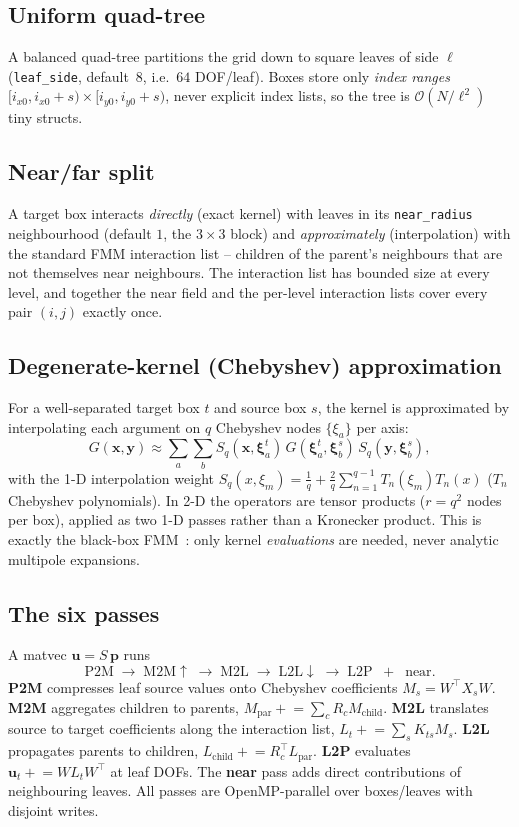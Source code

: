 \documentclass[11pt,a4paper]{article}
\newcommand{\Order}{\mathcal{O}}
\begin{document}
\subsection{Uniform quad-tree}
A balanced quad-tree partitions the grid down to square leaves of side
$\ell$ (\texttt{leaf\_side}, default~$8$, i.e.\ $64$ DOF/leaf). Boxes store
only \emph{index ranges} $[i_{x0},i_{x0}+s)\times[i_{y0},i_{y0}+s)$, never
explicit index lists, so the tree is $\Order(N/\ell^2)$ tiny structs.

\subsection{Near/far split}
A target box interacts \emph{directly} (exact kernel) with leaves in its
\texttt{near\_radius} neighbourhood (default $1$, the $3\times3$ block) and
\emph{approximately} (interpolation) with the standard FMM interaction list
-- children of the parent's neighbours that are not themselves near
neighbours. The interaction list has bounded size at every level, and
together the near field and the per-level interaction lists cover every pair
$(i,j)$ exactly once.

\subsection{Degenerate-kernel (Chebyshev) approximation}
For a well-separated target box $t$ and source box $s$, the kernel is
approximated by interpolating each argument on $q$ Chebyshev nodes
$\{\xi_a\}$ per axis:
\begin{equation}
  G(\mathbf{x},\mathbf{y}) \approx
  \sum_{a}\sum_{b} S_q(\mathbf{x},\boldsymbol{\xi}_a^{t})\,
  G(\boldsymbol{\xi}_a^{t},\boldsymbol{\xi}_b^{s})\,
  S_q(\mathbf{y},\boldsymbol{\xi}_b^{s}),
\end{equation}
with the 1-D interpolation weight
$S_q(x,\xi_m)=\tfrac1q+\tfrac2q\sum_{n=1}^{q-1}T_n(\xi_m)T_n(x)$
($T_n$ Chebyshev polynomials). In 2-D the operators are tensor products
($r=q^2$ nodes per box), applied as two 1-D passes rather than a Kronecker
product. This is exactly the black-box FMM~\cite{FongDarve2009}: only kernel
\emph{evaluations} are needed, never analytic multipole expansions.

\subsection{The six passes}
A matvec $\mathbf{u}=S\,\mathbf{p}$ runs
\[
\text{P2M}\;\to\;\text{M2M}\!\uparrow\;\to\;\text{M2L}\;\to\;
\text{L2L}\!\downarrow\;\to\;\text{L2P}\;\;+\;\;\text{near}.
\]
\textbf{P2M} compresses leaf source values onto Chebyshev coefficients
$M_s = W^\top X_s W$. \textbf{M2M} aggregates children to parents,
$M_{\text{par}}\mathrel{+}=\sum_c R_c M_{\text{child}}$. \textbf{M2L}
translates source to target coefficients along the interaction list,
$L_t\mathrel{+}=\sum_s K_{ts}M_s$. \textbf{L2L} propagates parents to
children, $L_{\text{child}}\mathrel{+}=R_c^\top L_{\text{par}}$. \textbf{L2P}
evaluates $\mathbf{u}_t\mathrel{+}=W L_t W^\top$ at leaf DOFs. The
\textbf{near} pass adds direct contributions of neighbouring leaves. All
passes are OpenMP-parallel over boxes/leaves with disjoint writes.
\end{document}
